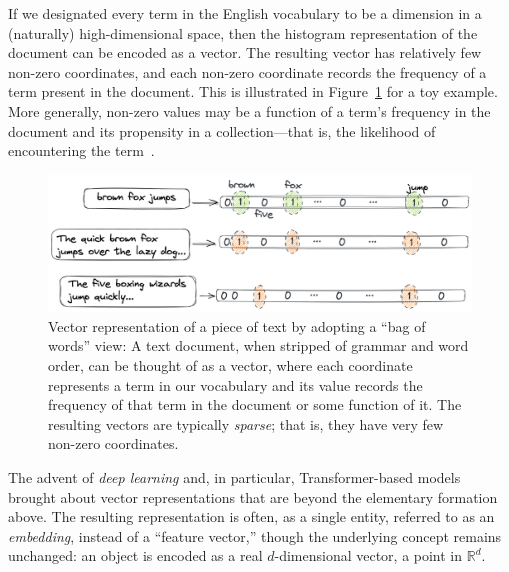 If we designated every term in the English vocabulary to be
a dimension in a (naturally) high-dimensional space,
then the histogram representation of the document can be encoded as a vector.
The resulting vector has relatively few non-zero coordinates,
and each non-zero coordinate records the frequency of a term present in the document.
This is illustrated in Figure~\ref{figure:flavors:text-sparse-vector} for a toy example.
More generally, non-zero values may be a function of a term's frequency in 
the document and its propensity in a collection---that is, the likelihood of encountering
the term~\citep{salton1988term}.

\begin{figure}[t]
    \centering
    \includegraphics[width=0.8\linewidth]{figures/text-sparse-vector.png}
    \caption{Vector representation of a piece of text by adopting
    a ``bag of words'' view: A text document, when stripped of grammar and word order,
    can be thought of as a vector, where each coordinate represents a term in our vocabulary
    and its value records the frequency of that term in the document or some function of it.
    The resulting vectors are typically \emph{sparse}; that is, they have very few non-zero coordinates.}
    \label{figure:flavors:text-sparse-vector}
\end{figure}

\bigskip

The advent of \emph{deep learning} and, in particular, Transformer-based models~\citep{vaswani2017attention}
brought about vector representations that are beyond the elementary formation above.
The resulting representation is often, as a single entity, referred to as an \emph{embedding},
instead of a ``feature vector,''
though the underlying concept remains unchanged: an object is encoded as a real $d$-dimensional vector,
a point in $\mathbb{R}^d$.

